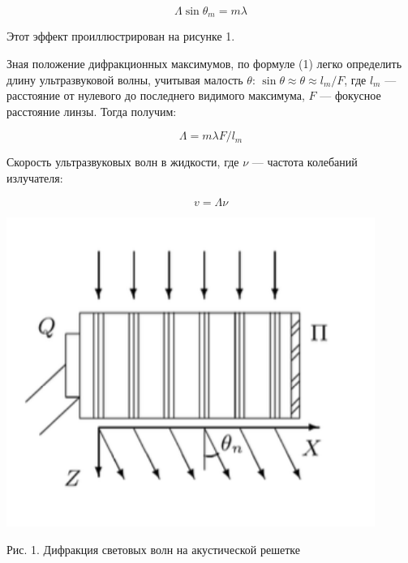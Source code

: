 \documentclass[a4paper,12pt]{article} %
\begin{document}
\begin{minipage}{0.5\textwidth}
\begin{equation}\label{}	
	\Lambda \sin \theta_m = m \lambda
\end{equation}

\noindent Этот эффект проиллюстрирован на рисунке 1.

\medskip

\noindent Зная положение дифракционных максимумов, по формуле (1) легко определить длину ультразвуковой волны, учитывая малость $ \theta $: $ \sin \theta \approx \theta \approx l_m /F  $, где $ l_m $ --- расстояние от нулевого до последнего видимого максимума, $ F $ --- фокусное расстояние линзы. Тогда получим:
	
	\begin{equation}\label{}
	 \Lambda = m \lambda F/ l_m 
	\end{equation}
	
\noindent Скорость ультразвуковых волн в жидкости, где $ \nu $ --- частота колебаний излучателя:
	
\begin{equation}\label{}
	v = \Lambda \nu 
\end{equation}


\end{minipage}	
\begin{minipage}{0.47\textwidth}
		\begin{center}
		
		\includegraphics[width=0.9\textwidth]{1.png}
		
		Рис. 1. Дифракция световых волн на акустической решетке
		\label{diff}
		
		\end{center}

\end{minipage}	
\end{document}
